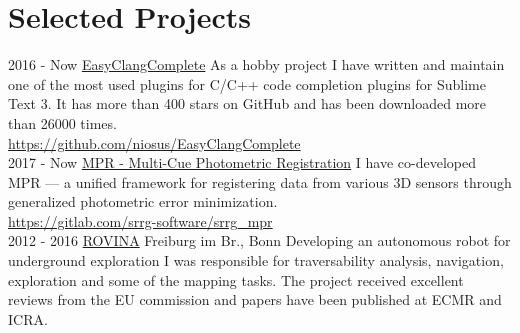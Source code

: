 \documentclass[]{friggeri-cv}
\begin{document}
\section{Selected Projects}
\begin{entrylist}
  \entry
    {2016 - Now}
    {\href{https://github.com/niosus/EasyClangComplete}{EasyClangComplete}}
    {}
    {As a hobby project I have written and maintain one of the most used plugins for C/C++ code completion plugins for Sublime Text 3. It has more than 400 stars on GitHub and has been downloaded more than 26000 times.\\\url{https://github.com/niosus/EasyClangComplete}\\}
  \entry
    {2017 - Now}
    {\href{https://gitlab.com/srrg-software/srrg_mpr}{MPR - Multi-Cue Photometric Registration}}
    {}
    {I have co-developed MPR --- a unified framework for registering data from various 3D sensors through generalized photometric error minimization.\\\url{https://gitlab.com/srrg-software/srrg_mpr}\\}
  \entry
    {2012 - 2016}
    {\href{http://www.rovina-project.eu/}{ROVINA}}
    {Freiburg im Br., Bonn}
    {Developing an autonomous robot for underground exploration I was responsible for traversability analysis, navigation, exploration and some of the mapping tasks. The project received excellent reviews from the EU commission and papers have been published at ECMR and ICRA.}
\end{entrylist}

\newpage
\end{document}
